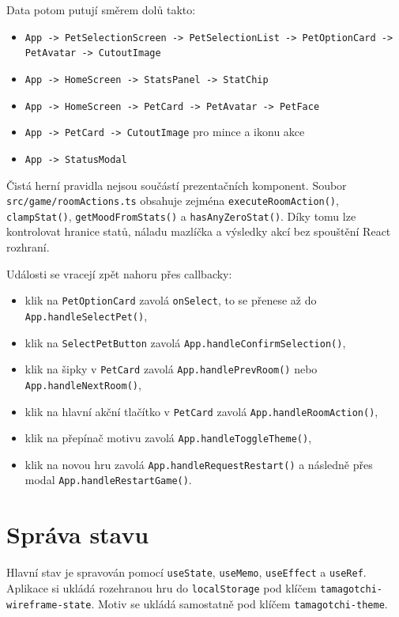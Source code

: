\documentclass[12pt,a4paper]{article}
\begin{document}
Data potom putují směrem dolů takto:
\begin{itemize}[leftmargin=2em]
  \item \texttt{App -> PetSelectionScreen -> PetSelectionList -> PetOptionCard -> PetAvatar -> CutoutImage}
  \item \texttt{App -> HomeScreen -> StatsPanel -> StatChip}
  \item \texttt{App -> HomeScreen -> PetCard -> PetAvatar -> PetFace}
  \item \texttt{App -> PetCard -> CutoutImage} pro mince a ikonu akce
  \item \texttt{App -> StatusModal}
\end{itemize}

Čistá herní pravidla nejsou součástí prezentačních komponent. Soubor \texttt{src/game/roomActions.ts} obsahuje zejména \texttt{executeRoomAction()}, \texttt{clampStat()}, \texttt{getMoodFromStats()} a \texttt{hasAnyZeroStat()}. Díky tomu lze kontrolovat hranice statů, náladu mazlíčka a výsledky akcí bez spouštění React rozhraní.

Události se vracejí zpět nahoru přes callbacky:
\begin{itemize}[leftmargin=2em]
  \item klik na \texttt{PetOptionCard} zavolá \texttt{onSelect}, to se přenese až do \texttt{App.handleSelectPet()},
  \item klik na \texttt{SelectPetButton} zavolá \texttt{App.handleConfirmSelection()},
  \item klik na šipky v \texttt{PetCard} zavolá \texttt{App.handlePrevRoom()} nebo \texttt{App.handleNextRoom()},
  \item klik na hlavní akční tlačítko v \texttt{PetCard} zavolá \texttt{App.handleRoomAction()},
  \item klik na přepínač motivu zavolá \texttt{App.handleToggleTheme()},
  \item klik na novou hru zavolá \texttt{App.handleRequestRestart()} a následně přes modal \texttt{App.handleRestartGame()}.
\end{itemize}

\section{Správa stavu}

Hlavní stav je spravován pomocí \texttt{useState}, \texttt{useMemo}, \texttt{useEffect} a \texttt{useRef}. Aplikace si ukládá rozehranou hru do \texttt{localStorage} pod klíčem \texttt{tamagotchi-wireframe-state}. Motiv se ukládá samostatně pod klíčem \texttt{tamagotchi-theme}.
\end{document}
